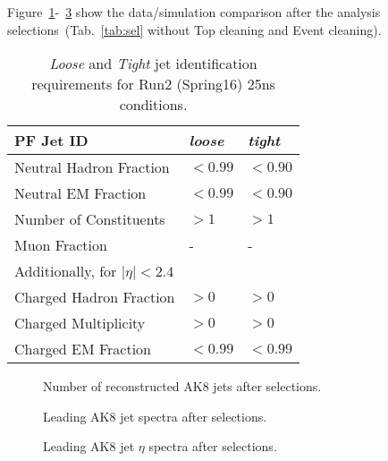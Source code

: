Figure~\ref{fig:n_AK8}-~\ref{fig:AK8jet_eta} show the data/simulation comparison after the analysis selections~(Tab.~\ref{tab:sel} without Top cleaning and Event cleaning).

\begin{table}[htb]
 \centering
 \begin{tabular}{lll}
\hline
PF Jet ID                       & \emph{loose}   & \emph{tight}   \\
\hline
Neutral Hadron Fraction         & $< 0.99  $     & $< 0.90  $    \\
Neutral EM Fraction             & $< 0.99  $     & $< 0.90  $\\
Number of Constituents          & $> 1     $     & $> 1     $\\
Muon Fraction                   & \--            & \-- \\
\hline
\multicolumn{3}{l}{Additionally, for $|\eta| < 2.4$ } \\
\hline
Charged Hadron Fraction         & $> 0   $& $> 0   $\\
Charged Multiplicity            & $> 0   $& $> 0   $\\
Charged EM Fraction             & $< 0.99$& $< 0.99$\\
\hline
 \end{tabular}
 \caption{ \emph{Loose} and \emph{Tight} jet identification requirements for Run2 (Spring16) 25ns conditions.\label{tab:JetId}}
\end{table}

\begin{figure}[!htb]
  \begin{center}
  \end{center}
  \caption{Number of reconstructed AK8 jets after selections.}
  \label{fig:n_AK8}
\end{figure}

\begin{figure}[!htb]
  \begin{center}
  \end{center}
  \caption{Leading AK8 jet \pt spectra after selections.}
  \label{fig:AK8jet_pt}
\end{figure}

\begin{figure}[!htb]
  \begin{center}
  \end{center}
  \caption{Leading AK8 jet $\eta$ spectra after selections.}
  \label{fig:AK8jet_eta}
\end{figure}


